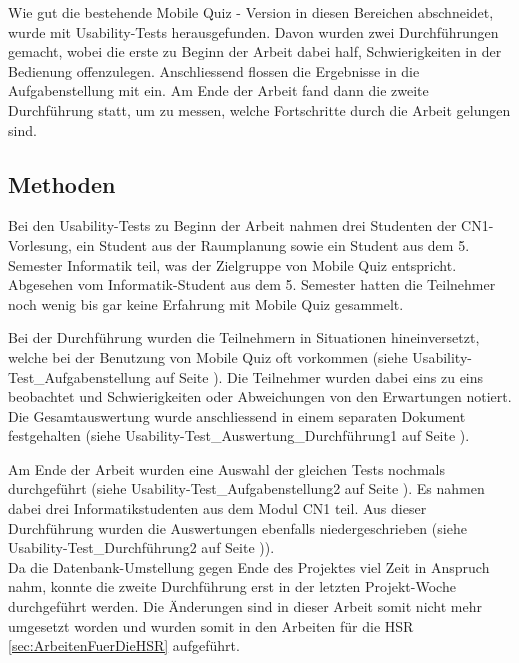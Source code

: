 Wie gut die bestehende Mobile Quiz - Version in diesen Bereichen abschneidet, wurde mit \gls{Usability-Test}s herausgefunden. Davon wurden zwei Durchführungen gemacht, wobei die erste zu Beginn der Arbeit dabei half, Schwierigkeiten in der Bedienung offenzulegen. Anschliessend flossen die Ergebnisse in die Aufgabenstellung mit ein. Am Ende der Arbeit fand dann die zweite Durchführung statt, um zu messen, welche Fortschritte durch die Arbeit gelungen sind.

\subsection{Methoden}
Bei den Usability-Tests zu Beginn der Arbeit nahmen drei Studenten der \acrfull{CN1}-Vorlesung, ein Student aus der Raumplanung sowie ein Student aus dem 5. Semester Informatik teil, was der Zielgruppe von Mobile Quiz entspricht. Abgesehen vom Informatik-Student aus dem 5. Semester hatten die Teilnehmer noch wenig bis gar keine Erfahrung mit Mobile Quiz gesammelt.

Bei der Durchführung wurden die Teilnehmern in Situationen hineinversetzt, welche bei der Benutzung von Mobile Quiz oft vorkommen (siehe Usability-Test\_Aufgabenstellung auf Seite \hyperlink{page.\getpagerefnumber{pdf:UTAS1}}{}). Die Teilnehmer wurden dabei eins zu eins beobachtet und Schwierigkeiten oder Abweichungen von den Erwartungen notiert. Die Gesamtauswertung wurde anschliessend in einem separaten Dokument festgehalten (siehe Usability-Test\_Auswertung\_Durchführung1 auf Seite \hyperlink{page.\getpagerefnumber{pdf:UTAW1}}{}).

Am Ende der Arbeit wurden eine Auswahl der gleichen Tests nochmals durchgeführt (siehe Usability-Test\_Aufgabenstellung2 auf Seite \hyperlink{page.\getpagerefnumber{pdf:UTAS2}}{}). Es nahmen dabei drei Informatikstudenten aus dem Modul \gls{CN1} teil. Aus dieser Durchführung wurden die Auswertungen ebenfalls niedergeschrieben (siehe Usability-Test\_Durchführung2 auf Seite \hyperlink{page.\getpagerefnumber{pdf:UTAW2}}{})).\\

Da die Datenbank-Umstellung gegen Ende des Projektes viel Zeit in Anspruch nahm, konnte die zweite Durchführung erst in der letzten Projekt-Woche durchgeführt werden. Die Änderungen sind in dieser Arbeit somit nicht mehr umgesetzt worden und wurden somit in den Arbeiten für die HSR \ref{sec:ArbeitenFuerDieHSR} aufgeführt.

